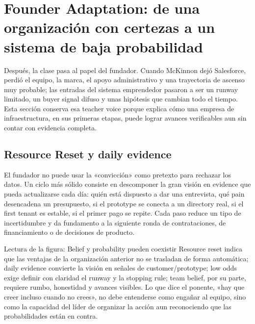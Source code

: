 \section{Founder Adaptation: de una organización con certezas a un sistema de baja probabilidad}

Después, la clase pasa al papel del fundador. Cuando McKinnon dejó Salesforce, perdió el equipo, la marca, el apoyo administrativo y una trayectoria de ascenso muy probable; las entradas del sistema emprendedor pasaron a ser un runway limitado, un buyer signal difuso y unas hipótesis que cambian todo el tiempo. Esta sección conserva esa teacher voice porque explica cómo una empresa de infraestructura, en sus primeras etapas, puede lograr avances verificables aun sin contar con evidencia completa.

\subsection{Resource Reset y daily evidence}

El fundador no puede usar la «convicción» como pretexto para rechazar los datos. Un ciclo más sólido consiste en descomponer la gran visión en evidence que pueda actualizarse cada día: quién está dispuesto a dar una entrevista, qué pain desencadena un presupuesto, si el prototype se conecta a un directory real, si el first tenant es estable, si el primer pago se repite. Cada paso reduce un tipo de incertidumbre y da fundamento a la siguiente ronda de contrataciones, de financiamiento o de decisiones de producto.


\begin{knowledgebox}{Lectura de la figura: Belief y probability pueden coexistir}
Resource reset indica que las ventajas de la organización anterior no se trasladan de forma automática; daily evidence convierte la visión en señales de customer/prototype; low odds exige definir con claridad el runway y la stopping rule; team belief, por su parte, requiere rumbo, honestidad y avances visibles. Lo que dice el ponente, «hay que creer incluso cuando no crees», no debe entenderse como engañar al equipo, sino como la capacidad del líder de organizar la acción aun reconociendo que las probabilidades están en contra.
\end{knowledgebox}

